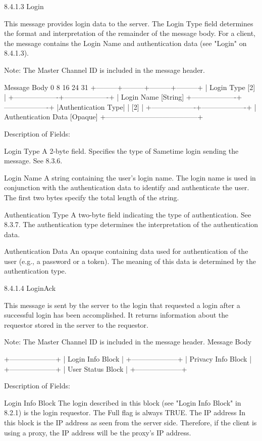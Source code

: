 \documentclass[titlepage,oneside]{book}
\begin{document}
8.4.1.3 Login

This message provides login data to the server. The Login Type field
determines the format and interpretation of the remainder of the
message body. For a client, the message contains the Login Name and
authentication data (see "Login" on 8.4.1.3).

Note: The Master Channel ID is included in the message header.

Message Body
0         8         16        24      31
+---------+---------+---------+---------+
| Login Type [2]    |
+-------------------+-------------------+
| Login Name [String]
+-------------------+-------------------+
|Authentication Type|
|        [2]        |
+-------------------+-------------------+
| Authentication Data [Opaque]
+---------------------------------------+


Description of Fields:

Login Type
  A 2-byte field. Specifies the type of Sametime login sending the
  message. See 8.3.6.

Login Name
  A string containing the user's login name. The login name is used in
  conjunction with the authentication data to identify and
  authenticate the user. The first two bytes specify the total length
  of the string.

Authentication Type
  A two-byte field indicating the type of authentication. See 
  8.3.7. The authentication type determines the 
  interpretation of the authentication data.

Authentication Data
  An opaque containing data used for authentication of the user (e.g.,
  a password or a token). The meaning of this data is determined by
  the authentication type.

8.4.1.4 LoginAck

This message is sent by the server to the login that requested a
login after a successful login has been accomplished. It returns
information about the requestor stored in the server to the requestor.

Note: The Master Channel ID is included in the message header.
Message Body

+--------------------+
|  Login Info Block  |
+--------------------+
| Privacy Info Block |
+--------------------+
|  User Status Block |
+--------------------+

Description of Fields:

Login Info Block
  The login described in this block (see "Login Info Block" in
  8.2.1) is the login requestor. The Full flag is always TRUE.
  The IP address
  In this block is the IP address as seen from the server side.
  Therefore, if the client is using a proxy, the IP address will be
  the proxy's IP address.
\end{document}

